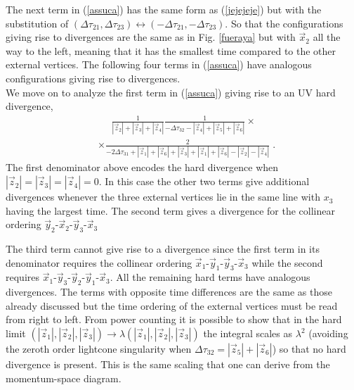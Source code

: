 \documentclass[%
 reprint,
 amsmath,amssymb,
 aps,
]{revtex4-1}
\begin{document}
 The next term in (\ref{assuca}) has the same form as (\ref{jejejeje}) but with the substitution of $(\Delta\tau_{21},\Delta\tau_{23})\leftrightarrow(-\Delta\tau_{21},-\Delta\tau_{23})$. So that the configurations giving rise to divergences are the same as in Fig. \ref{fueraya} but with $\vec{x}_2$ all the way to the left, meaning that it has the smallest time compared to the other external vertices. The following four terms in (\ref{assuca}) have analogous configurations giving rise to divergences.\\
 

 
 We move on to analyze the first term in (\ref{assuca}) giving rise to an UV hard divergence, 
 \begin{align}
&\;\;\;\;\;\frac{1}{|\vec{z}_2|+|\vec{z}_3|+|\vec{z}_4|}\frac{1}{-\Delta\tau_{32}-|\vec{z}_4|+|\vec{z}_5|+|\vec{z}_6|}\times\nonumber\\
&\times\frac{2}{-2\Delta\tau_{31}+|\vec{z}_1|+|\vec{z}_6|+|\vec{z}_3|+|\vec{z}_1|+|\vec{z}_6|-|\vec{z}_2|-|\vec{z}_4|}\;.
\end{align}
The first denominator above encodes the hard divergence when $|\vec{z}_2|=|\vec{z}_3|=|\vec{z}_4|=0$. In this case the other two terms give additional divergences whenever the three external vertices lie in the same line with $x_3$ having the largest time. The second term gives a divergence for the collinear ordering $\vec{y}_2$-$\vec{x}_2$-$\vec{y}_3$-$\vec{x}_3$ 
 \begin{figure}[ht!]
\centering
{}
\end{figure}

The third term cannot give rise to a divergence since the first term in its denominator requires the collinear ordering $\vec{x}_1$-$\vec{y}_1$-$\vec{y}_3$-$\vec{x}_3$ while the second requires $\vec{x}_1$-$\vec{y}_3$-$\vec{y}_2$-$\vec{y}_1$-$\vec{x}_3$. All the remaining hard terms have analogous divergences. The terms with opposite time differences are the same as those already discussed but the time ordering of the external vertices must be read from right to left. From power counting it is possible to show that in the hard limit $(|\vec{z}_1|,|\vec{z}_2|,|\vec{z}_3|)\to\lambda(|\vec{z}_1|,|\vec{z}_2|,|\vec{z}_3|)$ the integral scales as $\lambda^2$ (avoiding the zeroth order lightcone singularity when $\Delta\tau_{32}=|\vec{z}_5|+|\vec{z}_6|$) so that no hard divergence is present. This is the same scaling that one can derive from the momentum-space diagram. \par
\end{document}
